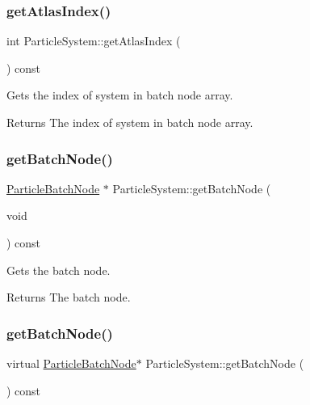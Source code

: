\subsubsection{\texorpdfstring{get\+Atlas\+Index()}{getAtlasIndex()}\hspace{0.1cm}{\footnotesize\ttfamily [2/2]}}
{\footnotesize\ttfamily int Particle\+System\+::get\+Atlas\+Index (\begin{DoxyParamCaption}{ }\end{DoxyParamCaption}) const\hspace{0.3cm}{\ttfamily [inline]}}

Gets the index of system in batch node array.

\begin{DoxyReturn}{Returns}
The index of system in batch node array. 
\end{DoxyReturn}
\mbox{\label{classParticleSystem_abc0ded8f688e32e0eaeb296bf07e05ac}} 
\subsubsection{\texorpdfstring{get\+Batch\+Node()}{getBatchNode()}\hspace{0.1cm}{\footnotesize\ttfamily [1/2]}}
{\footnotesize\ttfamily \hyperlink{classParticleBatchNode}{Particle\+Batch\+Node} $\ast$ Particle\+System\+::get\+Batch\+Node (\begin{DoxyParamCaption}\item[{void}]{ }\end{DoxyParamCaption}) const\hspace{0.3cm}{\ttfamily [virtual]}}

Gets the batch node.

\begin{DoxyReturn}{Returns}
The batch node. 
\end{DoxyReturn}
\mbox{\label{classParticleSystem_aa24f9dd4a3a2f4cae38fd0ff86d7ac2e}} 
\subsubsection{\texorpdfstring{get\+Batch\+Node()}{getBatchNode()}\hspace{0.1cm}{\footnotesize\ttfamily [2/2]}}
{\footnotesize\ttfamily virtual \hyperlink{classParticleBatchNode}{Particle\+Batch\+Node}$\ast$ Particle\+System\+::get\+Batch\+Node (\begin{DoxyParamCaption}{ }\end{DoxyParamCaption}) const\hspace{0.3cm}{\ttfamily [virtual]}}

